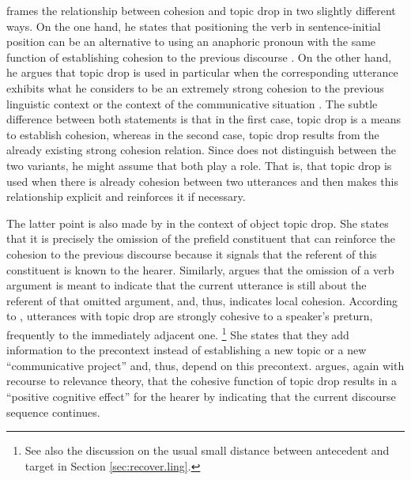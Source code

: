 \citet{auer1993} frames the relationship between cohesion and topic drop in two slightly different ways.
On the one hand, he states that positioning the verb in sentence-initial position can be an alternative to using an anaphoric pronoun with the same function of establishing cohesion to the previous discourse \citep[199]{auer1993}.
On the other hand, he argues that topic drop is used in particular when the corresponding utterance exhibits what he considers to be an extremely strong cohesion to the previous linguistic context or the context of the communicative situation \citep[203]{auer1993}.
The subtle difference between both statements is that in the first case, topic drop is a means to establish cohesion, whereas in the second case, topic drop results from the already existing strong cohesion relation.
Since \citet{auer1993} does not distinguish between the two variants, he might assume that both play a role.
That is, that topic drop is used when there is already cohesion between two utterances and then makes this relationship explicit and reinforces it if necessary.

The latter point is also made by \citet[128--129]{frick2017} in the context of object topic drop.
She states that it is precisely the omission of the prefield constituent that can reinforce the cohesion to the previous discourse because it signals that the referent of this constituent is known to the hearer.
Similarly, \citet[300--301]{sandig2000} argues that the omission of a verb argument  is meant to indicate that the current utterance is still about the referent of that omitted argument, and, thus, indicates local cohesion.
According to \citet[216]{helmer2016}, utterances with topic drop are strongly cohesive to a speaker's preturn, frequently to the immediately adjacent one.%
\footnote{See also the discussion on the usual small distance between antecedent and target in Section \ref{sec:recover.ling}.}
%
She states that they add information to the precontext instead of establishing a new topic or a new ``communicative project'' and, thus, depend on this precontext.
\citet[45]{helmer2016} argues, again with recourse to  relevance theory,  that the cohesive function of topic drop results in a ``positive cognitive effect'' for the hearer by indicating that the current discourse sequence continues. 

